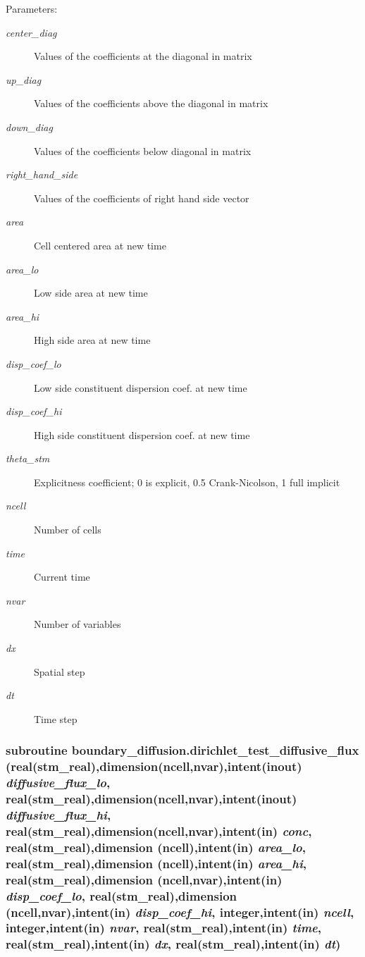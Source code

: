 \begin{Desc}
\item[Parameters:]
\begin{description}
\item[{\em center\_\-diag}]Values of the coefficients at the diagonal in matrix\item[{\em up\_\-diag}]Values of the coefficients above the diagonal in matrix\item[{\em down\_\-diag}]Values of the coefficients below diagonal in matrix\item[{\em right\_\-hand\_\-side}]Values of the coefficients of right hand side vector\item[{\em area}]Cell centered area at new time \item[{\em area\_\-lo}]Low side area at new time\item[{\em area\_\-hi}]High side area at new time \item[{\em disp\_\-coef\_\-lo}]Low side constituent dispersion coef. at new time\item[{\em disp\_\-coef\_\-hi}]High side constituent dispersion coef. at new time\item[{\em theta\_\-stm}]Explicitness coefficient; 0 is explicit, 0.5 Crank-Nicolson, 1 full implicit \item[{\em ncell}]Number of cells\item[{\em time}]Current time\item[{\em nvar}]Number of variables\item[{\em dx}]Spatial step \item[{\em dt}]Time step \end{description}
\end{Desc}
\hypertarget{a00054_3c1cb08501bda433a77faf26955c3886}{
\subsubsection[{dirichlet\_\-test\_\-diffusive\_\-flux}]{\setlength{\rightskip}{0pt plus 5cm}subroutine boundary\_\-diffusion.dirichlet\_\-test\_\-diffusive\_\-flux (real(stm\_\-real),dimension(ncell,nvar),intent(inout) {\em diffusive\_\-flux\_\-lo}, \/  real(stm\_\-real),dimension(ncell,nvar),intent(inout) {\em diffusive\_\-flux\_\-hi}, \/  real(stm\_\-real),dimension(ncell,nvar),intent(in) {\em conc}, \/  real(stm\_\-real),dimension         (ncell),intent(in) {\em area\_\-lo}, \/  real(stm\_\-real),dimension         (ncell),intent(in) {\em area\_\-hi}, \/  real(stm\_\-real),dimension (ncell,nvar),intent(in) {\em disp\_\-coef\_\-lo}, \/  real(stm\_\-real),dimension (ncell,nvar),intent(in) {\em disp\_\-coef\_\-hi}, \/  integer,intent(in) {\em ncell}, \/  integer,intent(in) {\em nvar}, \/  real(stm\_\-real),intent(in) {\em time}, \/  real(stm\_\-real),intent(in) {\em dx}, \/  real(stm\_\-real),intent(in) {\em dt})}}
\label{a00054_3c1cb08501bda433a77faf26955c3886}


